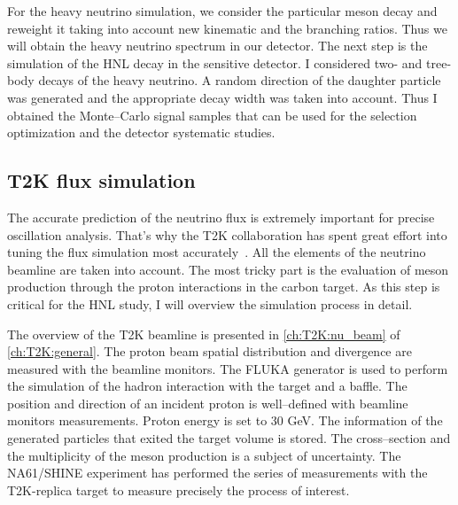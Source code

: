 \documentclass[../main.tex]{subfiles}
\begin{document}
For the heavy neutrino simulation, we consider the particular meson decay and reweight it taking into account new kinematic and the branching ratios. Thus we will obtain the heavy neutrino spectrum in our detector. The next step is the simulation of the HNL decay in the sensitive detector. I considered two- and tree-body decays of the heavy neutrino. A random direction of the daughter particle was generated and the appropriate decay width was taken into account. Thus I obtained the Monte--Carlo signal samples that can be used for the selection optimization and the detector systematic studies.

\subsection{T2K flux simulation}
The accurate prediction of the neutrino flux is extremely important for precise oscillation analysis. That's why the T2K collaboration has spent great effort into tuning the flux simulation most accurately~\cite{Abe2013}. All the elements of the neutrino beamline are taken into account. The most tricky part is the evaluation of meson production through the proton interactions in the carbon target. As this step is critical for the HNL study, I will overview the simulation process in detail.

The overview of the T2K beamline is presented in \autoref{ch:T2K:nu_beam} of \autoref{ch:T2K:general}. The proton beam spatial distribution and divergence are measured with the beamline monitors. The FLUKA generator is used to perform the simulation of the hadron interaction with the target and a baffle. The position and direction of an incident proton is well--defined with beamline monitors measurements. Proton energy is set to 30 GeV. The information of the generated particles that exited the target volume is stored. The cross--section and the multiplicity of the meson production is a subject of uncertainty. The NA61/SHINE experiment has performed the series of measurements with the T2K-replica target to measure precisely the process of interest.
\end{document}
